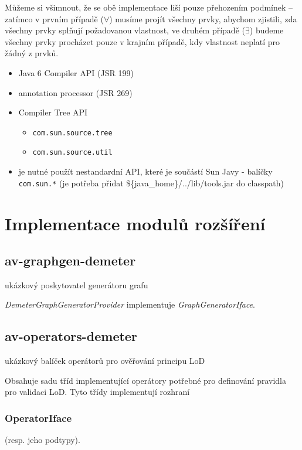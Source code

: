 Můžeme si všimnout, že se obě implementace liší pouze přehozením podmínek -- zatímco v prvním případě ($\forall$) musíme projít všechny prvky, abychom zjistili, zda všechny prvky splňují požadovanou vlastnost, ve druhém případě ($\exists$) budeme všechny prvky procházet pouze v krajním případě, kdy vlastnost neplatí pro žádný z prvků.

\begin{itemize}
\item Java 6 Compiler API (JSR 199) \cite{apidoc:java6api}
\item annotation processor (JSR 269)
\item Compiler Tree API
  \begin{itemize}
  \item \verb+com.sun.source.tree+
  \item \verb+com.sun.source.util+
  \end{itemize}
\item je nutné použít nestandardní API, které je součástí Sun Javy - balíčky \verb+com.sun.*+ (je potřeba přidat \$\{java\_home\}/../lib/tools.jar do classpath)
\end{itemize}

\section{Implementace modulů rozšíření}

\subsection{av-graphgen-demeter}
ukázkový poskytovatel generátoru grafu

\emph{DemeterGraphGeneratorProvider} implementuje \emph{GraphGeneratorIface}.

\subsection{av-operators-demeter}
ukázkový balíček operátorů pro ověřování principu LoD

Obsahuje sadu tříd implementující operátory potřebné pro definování pravidla pro validaci LoD. Tyto třídy implementují rozhraní \subsubsection{OperatorIface} (resp. jeho podtypy).

